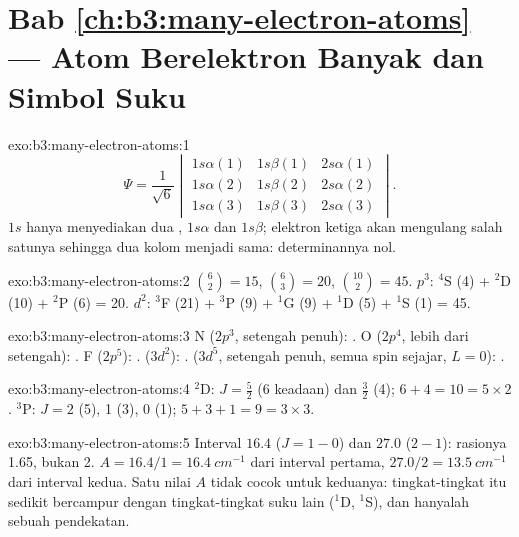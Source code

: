 \section*{Bab \ref{ch:b3:many-electron-atoms} --- Atom Berelektron Banyak dan Simbol Suku}

\begin{solution}{exo:b3:many-electron-atoms:1}
\[
\Psi = \frac{1}{\sqrt6}\begin{vmatrix}1s\alpha(1) & 1s\beta(1) & 2s\alpha(1)\\
1s\alpha(2) & 1s\beta(2) & 2s\alpha(2)\\ 1s\alpha(3) & 1s\beta(3) & 2s\alpha(3)
\end{vmatrix}.
\]
$1s$ hanya menyediakan dua , $1s\alpha$ dan $1s\beta$; elektron
ketiga akan mengulang salah satunya sehingga dua kolom menjadi sama:
determinannya nol.
\end{solution}

\begin{solution}{exo:b3:many-electron-atoms:2}
$\binom62 = 15$, $\binom63 = 20$, $\binom{10}{2} = 45$. $p^3$: ${}^4$S (4) +
${}^2$D (10) + ${}^2$P (6) = 20. $d^2$: ${}^3$F (21) + ${}^3$P (9) + ${}^1$G (9) +
${}^1$D (5) + ${}^1$S (1) = 45.
\end{solution}

\begin{solution}{exo:b3:many-electron-atoms:3}
N ($2p^3$, setengah penuh): . O ($2p^4$, lebih dari
setengah): . F ($2p^5$): .  ($3d^2$):
.  ($3d^5$, setengah penuh, semua spin sejajar,
$L = 0$): .
\end{solution}

\begin{solution}{exo:b3:many-electron-atoms:4}
${}^2$D: $J = \frac52$ (6 keadaan) dan $\frac32$ (4); $6 + 4 = 10 = 5 \times 2$.
${}^3$P: $J = 2$ (5), 1 (3), 0 (1); $5 + 3 + 1 = 9 = 3 \times 3$.
\end{solution}

\begin{solution}{exo:b3:many-electron-atoms:5}
Interval $16.4$ ($J = 1 - 0$) dan $27.0$ ($2 - 1$): rasionya 1.65, bukan 2.
$A = 16.4/1 = \qty{16.4}{cm^{-1}}$ dari interval pertama, $27.0/2 = \qty{13.5}{cm^{-1}}$
dari interval kedua. Satu nilai $A$ tidak cocok untuk keduanya: tingkat-tingkat
itu sedikit bercampur dengan tingkat-tingkat suku lain (${}^1$D, ${}^1$S), dan
 hanyalah sebuah pendekatan.
\end{solution}

